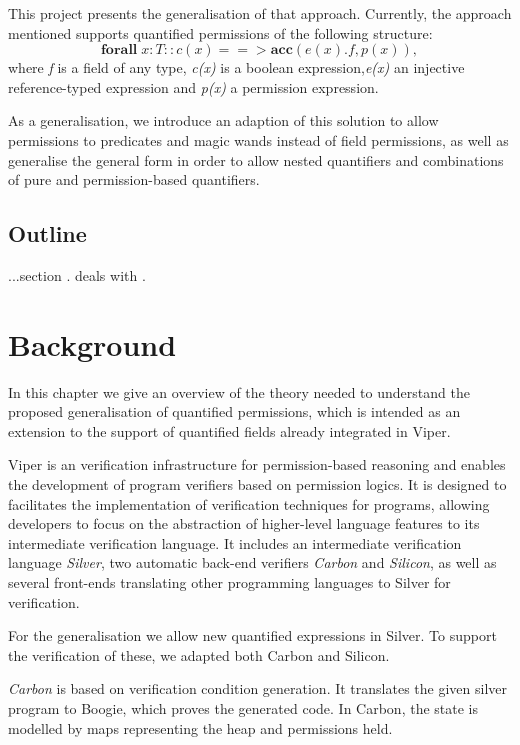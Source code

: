 \documentclass[12pt]{article}
\begin{document}
This project presents the generalisation of that approach. Currently, the approach mentioned supports quantified permissions of the following structure:
\begin{equation}
	\mathbf{forall} \; x:T :: c(x) ==>\mathbf{acc}( e(x).f, p(x) ) ,
\end{equation}
where {\it f} is a field of any type, {\it c(x)} is  a boolean expression,{\it e(x)} an injective reference-typed expression and {\it p(x)} a permission expression.

As a generalisation, we introduce an adaption of this solution to allow permissions to predicates\cite{predicates} and magic wands\cite{magicwand} instead of field permissions, as well as generalise the general form in order to allow nested quantifiers and combinations of pure and permission-based quantifiers.

\subsection{Outline}

...section . deals with .

\section{Background}
In this chapter we give an overview of the theory needed to understand the proposed generalisation of quantified permissions, which is intended as an extension to the support of quantified fields already integrated in Viper\cite{viper}\cite{viper2014}.

Viper is an verification infrastructure for permission-based reasoning and enables the development of program verifiers based on permission logics. It is designed to facilitates the implementation of verification techniques for programs, allowing developers to focus on the abstraction of higher-level language features to its intermediate verification language. It includes an intermediate verification language \textit{Silver}, two automatic back-end verifiers \textit{Carbon} and \textit{Silicon}, as well as several front-ends translating other programming languages to Silver for verification.

For the generalisation we allow new quantified expressions in Silver. To support the verification of these, we adapted both Carbon and Silicon. 

\textit{Carbon}  is based on verification condition generation. It translates the given silver program to Boogie\cite{leino2008boogie}, which proves the generated code.
In Carbon, the state is modelled by maps representing the heap and permissions held.
\end{document}

